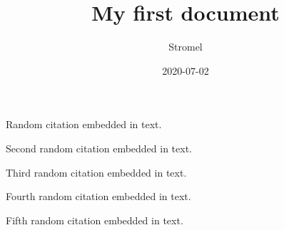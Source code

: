 \documentclass{article}
\title{My first document}
\date{2020-07-02}
\author{Stromel}
\begin{document}
	
	Random citation \autocite[1]{DUMMY:1} embedded in text.
	
	Second random citation \autocite[1]{ARTICLE:1} embedded in text.
	
	\newpage
	
	Third random citation \autocite[2]{BOOK:1} embedded in text.
	
	Fourth random citation \autocite[2]{BOOK:2} embedded in text.
	
	Fifth random citation \autocite[2]{WEBSITE:1} embedded in text.
	
	\newpage
	
\end{document}
